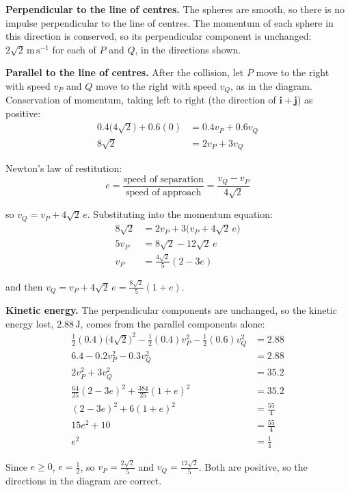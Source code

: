 \documentclass[leqno]{article}
\begin{document}
\begin{enumerate}[
  label=\textbf{\arabic*.},
  leftmargin=*,
  topsep=0pt,
  partopsep=0pt,
  parsep=0pt
]
\begin{djsSolution}
\begin{enumerate}[label=\textbf{(\alph*)}, start=1]
\begin{enumerate}[label=(\roman*), start=1]
\textbf{Perpendicular to the line of centres.} The spheres are smooth, so there is no impulse perpendicular to the line of centres. The momentum of each sphere in this direction is conserved, so its perpendicular component is unchanged: \(2\sqrt2\,\mathrm{m\,s^{-1}}\) for each of \(P\) and \(Q\), in the directions shown.

\textbf{Parallel to the line of centres.} After the collision, let \(P\) move to the right with speed \(v_P\) and \(Q\) move to the right with speed \(v_Q\), as in the diagram. Conservation of momentum, taking left to right (the direction of \(\mathbf{i}+\mathbf{j}\)) as positive:
\begin{align*}
0.4\bigl(4\sqrt2\bigr)+0.6(0)&=0.4v_P+0.6v_Q\\
8\sqrt2&=2v_P+3v_Q
\end{align*}

Newton's law of restitution:
\[
e=\frac{\text{speed of separation}}{\text{speed of approach}}=\frac{v_Q-v_P}{4\sqrt2}
\]

so \(v_Q=v_P+4\sqrt2\,e\). Substituting into the momentum equation:
\begin{align*}
8\sqrt2&=2v_P+3\bigl(v_P+4\sqrt2\,e\bigr)\\
5v_P&=8\sqrt2-12\sqrt2\,e\\
v_P&=\frac{4\sqrt2}{5}(2-3e)
\end{align*}

and then \(v_Q=v_P+4\sqrt2\,e=\frac{8\sqrt2}{5}(1+e)\).

\textbf{Kinetic energy.} The perpendicular components are unchanged, so the kinetic energy lost, \(2.88\,\mathrm{J}\), comes from the parallel components alone:
\begin{align*}
\frac12(0.4)\bigl(4\sqrt2\bigr)^2-\frac12(0.4)v_P^2-\frac12(0.6)v_Q^2&=2.88\\
6.4-0.2v_P^2-0.3v_Q^2&=2.88\\
2v_P^2+3v_Q^2&=35.2\\
\frac{64}{25}(2-3e)^2+\frac{384}{25}(1+e)^2&=35.2\\
(2-3e)^2+6(1+e)^2&=\frac{55}{4}\\
15e^2+10&=\frac{55}{4}\\
e^2&=\frac14
\end{align*}

Since \(e\geq0\), \(e=\frac12\), so \(v_P=\frac{2\sqrt2}{5}\) and \(v_Q=\frac{12\sqrt2}{5}\). Both are positive, so the directions in the diagram are correct.


\end{enumerate}
\end{enumerate}
\end{djsSolution}
\end{enumerate}
\end{document}
